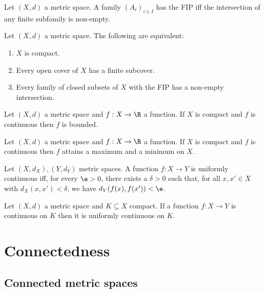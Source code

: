 \documentclass{article}
\begin{document}
\begin{definition}
	Let $(X,d)$ a metric space. A family $(A_i)_{i\in I}$ has the FIP iff
	the intersection of any finite subfamily is non-empty.
\end{definition}

\begin{theorem}[9.20]
	Let $(X,d)$ a metric space. The following are equivalent:
	\begin{enumerate}
		\item $X$ is compact.
		\item Every open cover of $X$ has a finite subcover.
		\item Every family of closed subsets of $X$ with the FIP has a non-empty intersection.
	\end{enumerate}
\end{theorem}

\begin{proposition}[9.22]
	Let $(X,d)$ a metric space and $f:X\to\R$ a function.
	If $X$ is compact and $f$ is continuous then $f$ is bounded.
\end{proposition}

\begin{proposition}[9.23]
	Let $(X,d)$ a metric space and $f:X\to\R$ a function. If $X$ is compact
	and $f$ is continuous then $f$ attains a maximum and a minimum on $X$.
\end{proposition}

\begin{definition}
	Let $(X,d_X),(Y,d_Y)$ metric spaces. A function $f:X\to Y$ is
	uniformly continuous iff, for every $\e>0$, there exists a $\delta>0$ such that,
	for all $x,x'\in X$ with $d_X(x,x')<\delta$, we have $d_Y(f(x),f(x'))<\e$.
\end{definition}

\begin{proposition}[9.26]
	Let $(X,d)$ a metric space and $K\subseteq X$ compact. If a function $f:X\to Y$
	is continuous on $K$ then it is uniformly continuous on $K$.
\end{proposition}

\section{Connectedness}

\subsection{Connected metric spaces}
\end{document}
